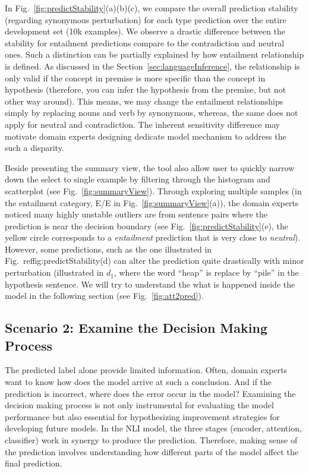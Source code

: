 In Fig.~\ref{fig:predictStability}(a)(b)(c),  %
we compare the overall prediction stability (regarding synonymous perturbation) for each type prediction over the entire development set (10k examples).
%
We observe a drastic difference between the stability for entailment predictions compare to the contradiction and neutral ones.
%
Such a distinction can be partially explained by how entailment relationship is defined. As discussed in the Section~\ref{sec:languageInference}, the relationship is only valid if the concept in premise is more specific than the concept in hypothesis (therefore, you can infer the hypothesis from the premise, but not other way around). This means, we may change the entailment relationships simply by replacing nouns and verb by synonymous, whereas, the same does not apply for neutral and contradiction.
%
The inherent sensitivity difference may motivate domain experts designing dedicate model mechanism to address the such a disparity.

Beside presenting the summary view, the tool also allow user to quickly narrow down the select to single example  by filtering through the histogram and scatterplot (see Fig.~\ref{fig:summaryView}). 
%
Through exploring multiple samples (in the entailment category, E/E in Fig.~\ref{fig:summaryView}(a)), the domain experts noticed many highly unstable outliers are from sentence pairs where the prediction is near the decision boundary (see Fig.~\ref{fig:predictStability}(e), the yellow circle corresponds to a \emph{entailment} prediction that is very close to \emph{neutral}). 
However, some predictions, such as the one illustrated in Fig.~ref{fig:predictStability}(d) can alter the prediction quite drastically with minor perturbation (illustrated in $d_1$, where the word ``heap'' is replace by ``pile'' in the hypothesis sentence. We will try to understand the what is happened inside the model in the following section (see Fig.~\ref{fig:att2pred}).

\subsection{Scenario 2: Examine the Decision Making Process}
The predicted label alone provide limited information. Often, domain experts want to know how does the model arrive at such a conclusion. And if the prediction is incorrect, where does the error occur in the model?
%
Examining the decision making process is not only instrumental for evaluating the model performance but also essential for hypothesizing improvement strategies for developing future models.
%
In the NLI model, the three stages (encoder, attention, classifier) work in synergy to produce the prediction.
Therefore, making sense of the prediction involves understanding how different parts of the model affect the final prediction.

